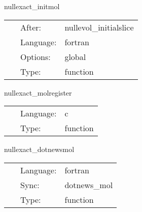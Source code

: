 \vspace{5mm}


\hspace{5mm} nullexact\_initmol 

\hspace{5mm}{\it initial data } 


\hspace{5mm}

 \begin{tabular*}{160mm}{cll} 
~ & After:  & nullevol\_initialslice \\ 
~ & Language:  & fortran \\ 
~ & Options:  & global \\ 
~ & Type:  & function \\ 
\end{tabular*} 


\vspace{5mm}


\hspace{5mm} nullexact\_molregister 

\hspace{5mm}{\it register variables for mol } 


\hspace{5mm}

 \begin{tabular*}{160mm}{cll} 
~ & Language:  & c \\ 
~ & Type:  & function \\ 
\end{tabular*} 


\vspace{5mm}


\hspace{5mm} nullexact\_dotnewsmol 

\hspace{5mm}{\it calculate the integral of psi4 } 


\hspace{5mm}

 \begin{tabular*}{160mm}{cll} 
~ & Language:  & fortran \\ 
~ & Sync:  & dotnews\_mol \\ 
~ & Type:  & function \\ 
\end{tabular*} 


